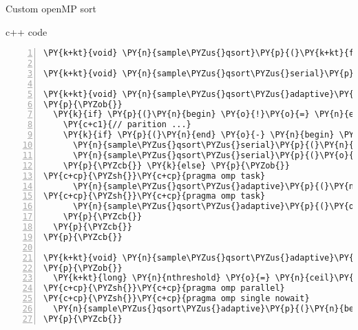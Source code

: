 \documentclass{beamer}
\begin{document}
\begin{frame}[fragile]{Custom openMP sort}

\begin{block}{c++ code}

\tiny
\begin{Verbatim}[commandchars=\\\{\},numbers=left,firstnumber=1,stepnumber=1]
\PY{k+kt}{void} \PY{n}{sample\PYZus{}qsort}\PY{p}{(}\PY{k+kt}{float}\PY{o}{*} \PY{n}{begin}\PY{p}{,} \PY{k+kt}{float}\PY{o}{*} \PY{n}{end}\PY{p}{)} \PY{p}{\PYZob{}} \PY{p}{.}\PY{p}{.}\PY{p}{.} \PY{p}{\PYZcb{}}

\PY{k+kt}{void} \PY{n}{sample\PYZus{}qsort\PYZus{}serial}\PY{p}{(}\PY{k+kt}{float}\PY{o}{*} \PY{n}{begin}\PY{p}{,} \PY{k+kt}{float}\PY{o}{*} \PY{n}{end}\PY{p}{)} \PY{p}{\PYZob{}} \PY{p}{.}\PY{p}{.}\PY{p}{.} \PY{p}{\PYZcb{}}

\PY{k+kt}{void} \PY{n}{sample\PYZus{}qsort\PYZus{}adaptive}\PY{p}{(}\PY{k+kt}{float}\PY{o}{*} \PY{n}{begin}\PY{p}{,} \PY{k+kt}{float}\PY{o}{*} \PY{n}{end}\PY{p}{,} \PY{k}{const} \PY{k+kt}{long} \PY{n}{nthreshold}\PY{p}{)}
\PY{p}{\PYZob{}}
  \PY{k}{if} \PY{p}{(}\PY{n}{begin} \PY{o}{!}\PY{o}{=} \PY{n}{end}\PY{p}{)} \PY{p}{\PYZob{}}
    \PY{c+c1}{// parition ...}
    \PY{k}{if} \PY{p}{(}\PY{n}{end} \PY{o}{-} \PY{n}{begin} \PY{o}{+} \PY{l+m+mi}{1} \PY{o}{<}\PY{o}{=} \PY{n}{nthreshold}\PY{p}{)} \PY{p}{\PYZob{}}
      \PY{n}{sample\PYZus{}qsort\PYZus{}serial}\PY{p}{(}\PY{n}{begin}\PY{p}{,} \PY{n}{middle}\PY{p}{)}\PY{p}{;}
      \PY{n}{sample\PYZus{}qsort\PYZus{}serial}\PY{p}{(}\PY{o}{+}\PY{o}{+}\PY{n}{middle}\PY{p}{,} \PY{o}{+}\PY{o}{+}\PY{n}{end}\PY{p}{)}\PY{p}{;}
    \PY{p}{\PYZcb{}} \PY{k}{else} \PY{p}{\PYZob{}}
\PY{c+cp}{\PYZsh{}}\PY{c+cp}{pragma omp task}
      \PY{n}{sample\PYZus{}qsort\PYZus{}adaptive}\PY{p}{(}\PY{n}{begin}\PY{p}{,} \PY{n}{middle}\PY{p}{,} \PY{n}{nthreshold}\PY{p}{)}\PY{p}{;}
\PY{c+cp}{\PYZsh{}}\PY{c+cp}{pragma omp task}
      \PY{n}{sample\PYZus{}qsort\PYZus{}adaptive}\PY{p}{(}\PY{o}{+}\PY{o}{+}\PY{n}{middle}\PY{p}{,} \PY{o}{+}\PY{o}{+}\PY{n}{end}\PY{p}{,} \PY{n}{nthreshold}\PY{p}{)}\PY{p}{;}
    \PY{p}{\PYZcb{}}
  \PY{p}{\PYZcb{}}
\PY{p}{\PYZcb{}}

\PY{k+kt}{void} \PY{n}{sample\PYZus{}qsort\PYZus{}adaptive}\PY{p}{(}\PY{k+kt}{float}\PY{o}{*} \PY{n}{begin}\PY{p}{,} \PY{k+kt}{float}\PY{o}{*} \PY{n}{end}\PY{p}{)}
\PY{p}{\PYZob{}}
  \PY{k+kt}{long} \PY{n}{nthreshold} \PY{o}{=} \PY{n}{ceil}\PY{p}{(}\PY{n}{sqrt}\PY{p}{(}\PY{n}{end} \PY{o}{-} \PY{n}{begin} \PY{o}{+} \PY{l+m+mi}{1}\PY{p}{)}\PY{p}{)} \PY{o}{/} \PY{l+m+mi}{2}\PY{p}{;}
\PY{c+cp}{\PYZsh{}}\PY{c+cp}{pragma omp parallel}
\PY{c+cp}{\PYZsh{}}\PY{c+cp}{pragma omp single nowait}
  \PY{n}{sample\PYZus{}qsort\PYZus{}adaptive}\PY{p}{(}\PY{n}{begin}\PY{p}{,} \PY{n}{end}\PY{p}{,} \PY{n}{nthreshold}\PY{p}{)}\PY{p}{;}
\PY{p}{\PYZcb{}}
\end{Verbatim}

\end{block}

\end{frame}
\end{document}
